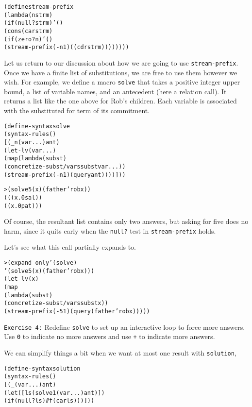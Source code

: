 \begin{alltt}
(define stream-prefix
  (lambda (n strm)
    (if (null? strm) '()
      (cons (car strm)
        (if (zero? n) '()
          (stream-prefix (- n 1) ((cdr strm))))))))
\end{alltt}

Let us return to our discussion about how we are going to use
\texttt{stream-prefix}.  Once we have a finite list of substitutions,
we are free to use them however we wish. For example, we define a
macro \texttt{solve} that takes a positive integer upper bound, a list
of variable names, and an antecedent (here a relation call).  It
returns a list like the one above for Rob's children.  Each variable
is associated with the substituted for term of its commitment.

\begin{alltt}
(define-syntax solve
  (syntax-rules ()
    [(_ n (var ...) ant)
     (let-lv (var ...)
       (map (lambda (subst)
              (concretize-subst/vars subst var ...))
         (stream-prefix (- n 1) (query ant))))]))
\end{alltt}

\begin{alltt}
> (solve 5 (x) (father 'rob x))
(((x.0 sal))
 ((x.0 pat)))
\end{alltt}

\noindent
Of course, the resultant list contains only two answers, but
asking for five does no harm, since it quits early when the
\texttt{null?} test in \texttt{stream-prefix} holds.

Let's see what this call partially expands to.
\begin{alltt}
> (expand-only '(solve)
    '(solve 5 (x) (father 'rob x)))
(let-lv (x)
  (map
    (lambda (subst)
      (concretize-subst/vars subst x))
    (stream-prefix (- 5 1) (query (father 'rob x)))))
\end{alltt}

\noindent
\texttt{Exercise 4:} Redefine \texttt{solve} to set up an interactive
loop to force more answers.  Use \texttt{0} to indicate no more
answers and use \texttt{+} to indicate more answers.\endofexercise

We can simplify things a bit when we want at most one result with
\texttt{solution},

\begin{alltt}
(define-syntax solution
  (syntax-rules ()
    [(_ (var ...) ant)
     (let ([ls (solve 1 (var ...) ant)])
       (if (null? ls) #f (car ls)))]))
\end{alltt}

